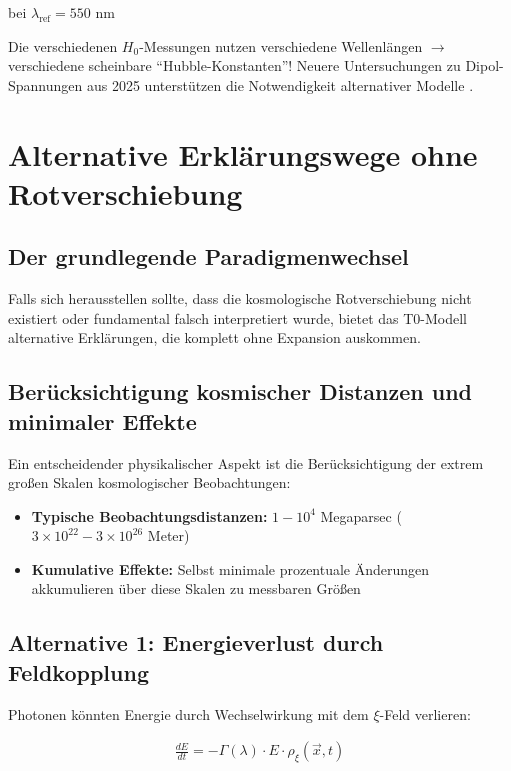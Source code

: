 \documentclass{article}
\begin{document}
	bei $\lambda_{\text{ref}} = 550$ nm
	
	Die verschiedenen $H_0$-Messungen nutzen verschiedene Wellenlängen $\rightarrow$ verschiedene scheinbare ``Hubble-Konstanten''! Neuere Untersuchungen zu Dipol-Spannungen aus 2025 unterstützen die Notwendigkeit alternativer Modelle \cite{landstry2025, bengaly2025}.
	
	\section{Alternative Erklärungswege ohne Rotverschiebung}
	
	\subsection{Der grundlegende Paradigmenwechsel}
	
	Falls sich herausstellen sollte, dass die kosmologische Rotverschiebung nicht existiert oder fundamental falsch interpretiert wurde, bietet das T0-Modell alternative Erklärungen, die komplett ohne Expansion auskommen.
	
	\subsection{Berücksichtigung kosmischer Distanzen und minimaler Effekte}
	
	Ein entscheidender physikalischer Aspekt ist die Berücksichtigung der extrem großen Skalen kosmologischer Beobachtungen:
	
	\begin{itemize}
		\item \textbf{Typische Beobachtungsdistanzen:} $1 - 10^4$ Megaparsec ($3 \times 10^{22} - 3 \times 10^{26}$ Meter)
		\item \textbf{Kumulative Effekte:} Selbst minimale prozentuale Änderungen akkumulieren über diese Skalen zu messbaren Größen
	\end{itemize}
	
	\subsection{Alternative 1: Energieverlust durch Feldkopplung}
	
	Photonen könnten Energie durch Wechselwirkung mit dem $\xi$-Feld verlieren:
	
	\begin{align}
		\frac{dE}{dt} = -\Gamma(\lambda) \cdot E \cdot \rho_\xi(\vec{x},t)
	\end{align}
	
\end{document}
